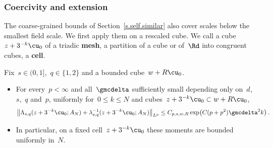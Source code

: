 \documentclass[11pt]{amsart}
\begin{document}
\smallskip

\subsubsection{Coercivity and extension}

The coarse-grained bounds of Section~\ref{s.self.similar} also cover scales below the smallest field scale. We first apply them on a rescaled cube. We call a cube~$z+3^{-k}\cu_0$ of a triadic \textbf{mesh}, a partition of a cube or of~$\Rd$ into congruent cubes, a \textbf{cell}.

\begin{lemma}
\label{mfd:lem-cell-ellipticity}
Fix~$s\in(0,1]$,~$q\in\{1,2\}$ and a bounded cube~$w+R\cu_0$.
\begin{itemize}
\item For every~$p<\infty$ and all~$\gmcdelta$ sufficiently small depending only on~$d$,~$s$,~$q$ and~$p$, uniformly for~$0\leq k\leq N$ and cubes~$z+3^{-k}\cu_0\subset w+R\cu_0$,
\begin{equation}
	\bigl\|\Lambda_{s,q}(z+3^{-k}\cu_0;A_N)+\lambda_{s,q}^{-1}(z+3^{-k}\cu_0;A_N)\bigr\|_{L^p}
	\leq C_{p,s,w,R}\exp\bigl(C(p+p^2)\gmcdelta^2k\bigr)\,.
	\label{eq:mfd-cell-moment}
\end{equation}
\item In particular, on a fixed cell~$z+3^{-k}\cu_0$ these moments are bounded uniformly in~$N$.
\end{itemize}
\end{lemma}
\end{document}
